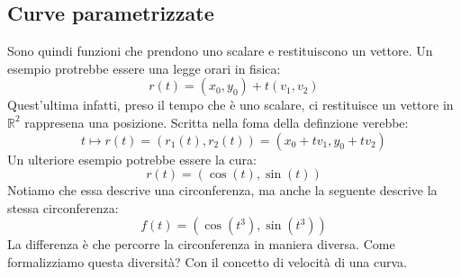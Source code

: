 \subsection{Curve parametrizzate}
Sono quindi funzioni che prendono uno scalare e restituiscono un vettore. Un 
esempio protrebbe essere una legge orari in fisica:
\begin{equation*}
	r(t) = (x_0, y_0) + t(v_1, v_2)
\end{equation*}
Quest'ultima infatti, preso il tempo che è uno scalare, ci restituisce un 
vettore in $\mathbb{R}^2$ rappresena una posizione. Scritta nella foma della 
definzione verebbe:
\begin{equation*}
	t \mapsto r(t) = (r_1(t), r_2(t)) = (x_0 + tv_1, y_0 + tv_2)
\end{equation*}
Un ulteriore esempio potrebbe essere la cura:
\begin{equation*}
	r(t) = (\cos(t), \sin(t))
\end{equation*}
Notiamo che essa descrive una circonferenza, ma anche la seguente descrive la 
stessa circonferenza:
\begin{equation*}
	f(t) = (\cos(t^3), \sin(t^3))
\end{equation*}
La differenza è che percorre la circonferenza in maniera diversa. Come 
formalizziamo questa diversità? Con il concetto di velocità di una curva.
